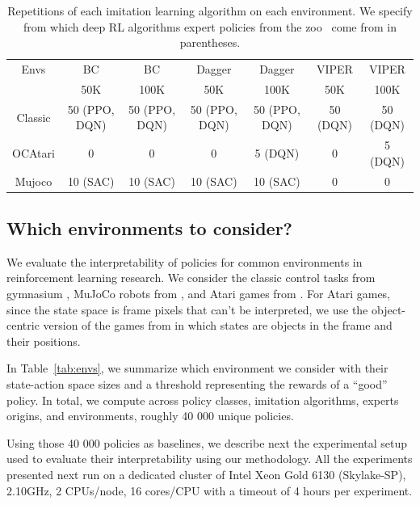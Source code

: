 \begin{table}
  \centering
  \footnotesize
  \begin{tabular}{c|cccccc}
  \toprule
  Envs & BC & BC & Dagger & Dagger & VIPER & VIPER\\
   & 50K & 100K & 50K & 100K & 50K & 100K\\
  \midrule
  Classic& 50 (PPO, DQN)& 50 (PPO, DQN)& 50 (PPO, DQN)& 50 (PPO, DQN)&  50 (DQN) & 50 (DQN)\\
  OCAtari& 0 & 0 & 0 & 5 (DQN)&  0 & 5 (DQN)\\
  Mujoco& 10 (SAC)& 10 (SAC)& 10 (SAC)& 10 (SAC)&  0 & 0\\
  \bottomrule
  \end{tabular}
  \caption{Repetitions of each imitation learning algorithm on each environment. We specify from which deep RL algorithms expert policies from the zoo~\citep{zoo} come from in parentheses.}
  \label{tab:repet-distill}
\end{table}

\subsection{Which environments to consider?}
We evaluate the interpretability of policies for common environments in reinforcement learning research.
We consider the classic control tasks from gymnasium \cite{gymnasium}, MuJoCo robots from \cite{mujoco}, and Atari games from \cite{atari}.
For Atari games, since the state space is frame pixels that can't be interpreted, we use the object-centric version of the games from \cite{ocatari} in which states are objects in the frame and their positions.

In Table~\ref{tab:envs}, we summarize which environment we consider with their state-action space sizes and a threshold representing the rewards of a ``good'' policy.
In total, we compute across policy classes, imitation algorithms, experts origins, and environments, roughly 40 000 unique policies.

Using those 40 000 policies as baselines, we describe next the experimental setup used to evaluate their interpretability using our methodology.
All the experiments presented next run on a dedicated cluster of Intel Xeon Gold 6130 (Skylake-SP), 2.10GHz, 2 CPUs/node, 16 cores/CPU with a timeout of 4 hours per experiment.

